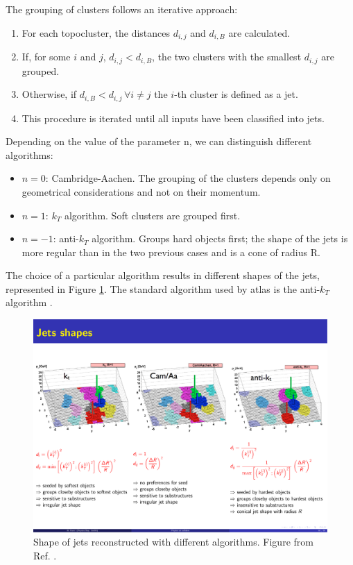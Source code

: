 The grouping of clusters follows an iterative approach:
\begin{enumerate}
\item For each topocluster, the distances $d_{i,j}$ and $d_{i,B}$ are calculated.
\item If, for some $i$ and $j$, $d_{i,j} < d_{i,B}$, the two clusters with the smallest $d_{i,j}$ are grouped. 
\item Otherwise, if $d_{i,B} < d_{i,j} \, \forall i \neq j $ the $i$-th cluster is defined as a jet.
\item This procedure is iterated until all inputs have been classified into jets.
\end{enumerate}

\noindent Depending on the value of the parameter n, we can distinguish different algorithms:
\begin{itemize}
\item $n=0$: Cambridge-Aachen. The grouping of the clusters depends only on geometrical considerations and not on their momentum. 
\item $n=1$: $k_T$ algorithm. Soft clusters are grouped first.
\item $n=-1$: anti-$k_T$ algorithm. Groups hard objects first; the shape of the jets is more regular than in the two previous cases and is a cone of radius R.
\end{itemize}

The choice of a particular algorithm results in different shapes of the jets, represented in Figure \ref{fig:jetsalg}. The standard algorithm used by \gls{atlas} is the anti-$k_T$ algorithm \cite{cacciari:antikt}.

\begin{figure}[h]
\includegraphics[width=\textwidth]{./figures/objects/jetsalg.pdf}
\caption[Shape of jets reconstructed with different algorithms]{Shape of jets reconstructed with different algorithms.
Figure from Ref. \cite{cacciari:antikt}.}
\label{fig:jetsalg}
\end{figure}

